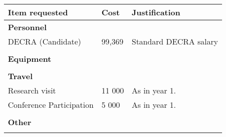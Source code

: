 \documentclass{amsart}
\begin{document}
\begin{center}
\begin{tabular}{|l|l|p{10cm}|}
\hline
\textbf{Item requested} & \textbf{Cost} & \textbf{Justification}\\
\hline
\textbf{Personnel} &  & \\
DECRA (Candidate) & 99,369 & Standard DECRA salary\\
 &  & \\
\textbf{Equipment} &  & \\
 &  & \\
\textbf{Travel} &  & \\
Research visit & 11 000 & As in year 1.\\
Conference Participation & 5 000 & As in year 1.\\
 &  & \\
\textbf{Other} &  & \\
 &  & \\
\hline
\end{tabular}
\end{center}
\end{document}

